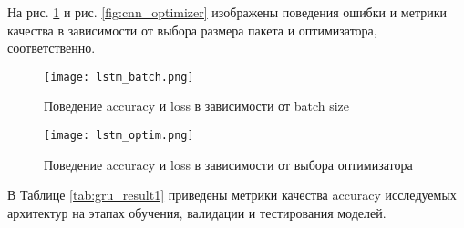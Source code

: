 На рис. \ref{fig:lstm_batch} и рис. \ref{fig:cnn_optimizer} изображены поведения ошибки и метрики качества в зависимости от выбора размера пакета и оптимизатора, соответственно.
\begin{figure}[H]
    \centering
    \texttt{[image: lstm\_batch.png]}
    \caption{Поведение accuracy и loss в зависимости от batch size}
    \label{fig:lstm_batch}
\end{figure}
\begin{figure}[H]
    \centering
    \texttt{[image: lstm\_optim.png]}
    \caption{Поведение accuracy и loss в зависимости от выбора оптимизатора}
    \label{fig:lstm_optimizer}
\end{figure}
В Таблице \ref{tab:gru_result1} приведены метрики качества accuracy исследуемых архитектур на этапах обучения, валидации и тестирования моделей. 
